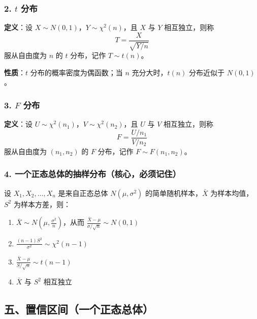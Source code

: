 \documentclass[12pt,a4paper]{ctexart}
\begin{document}
\subsubsection{2. $t$ 分布}
\textbf{定义}：设 $X \sim N(0, 1)$，$Y \sim \chi^2(n)$，且 $X$ 与 $Y$ 相互独立，则称
\[
    T = \frac{X}{\sqrt{Y/n}}
\]
服从自由度为 $n$ 的 $t$ 分布，记作 $T \sim t(n)$。

\textbf{性质}：$t$ 分布的概率密度为偶函数；当 $n$ 充分大时，$t(n)$ 分布近似于 $N(0, 1)$。

\subsubsection{3. $F$ 分布}
\textbf{定义}：设 $U \sim \chi^2(n_1)$，$V \sim \chi^2(n_2)$，且 $U$ 与 $V$ 相互独立，则称
\[
    F = \frac{U/n_1}{V/n_2}
\]
服从自由度为 $(n_1, n_2)$ 的 $F$ 分布，记作 $F \sim F(n_1, n_2)$。

\subsubsection{4. 一个正态总体的抽样分布（核心，必须记住）}
设 $X_1, X_2, \dots, X_n$ 是来自正态总体 $N(\mu, \sigma^2)$ 的简单随机样本，$\bar{X}$ 为样本均值，$S^2$ 为样本方差，则：
\begin{enumerate}[noitemsep]
    \item $\bar{X} \sim N(\mu, \frac{\sigma^2}{n})$，从而 $\frac{\bar{X} - \mu}{\sigma/\sqrt{n}} \sim N(0, 1)$
    \item $\frac{(n-1)S^2}{\sigma^2} \sim \chi^2(n-1)$
    \item $\frac{\bar{X} - \mu}{S/\sqrt{n}} \sim t(n-1)$
    \item $\bar{X}$ 与 $S^2$ 相互独立
\end{enumerate}

\subsection{五、置信区间（一个正态总体）}
\end{document}

